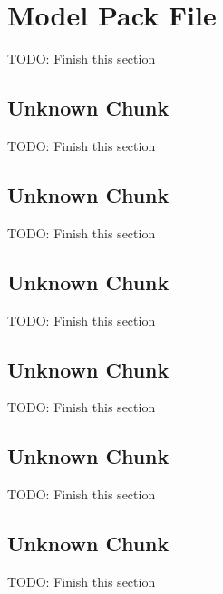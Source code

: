\section{Model Pack File}
\label{sec:pfMODL}

TODO: Finish this section

\subsection{Unknown Chunk}
\label{subsec:pfchunkANIM}

TODO: Finish this section

\subsection{Unknown Chunk}
\label{subsec:pfchunkMODL}

TODO: Finish this section

\subsection{Unknown Chunk}
\label{subsec:pfchunkGEOM}

TODO: Finish this section

\subsection{Unknown Chunk}
\label{subsec:pfchunkPRPS}

TODO: Finish this section

\subsection{Unknown Chunk}
\label{subsec:pfchunkROOT}

TODO: Finish this section

\subsection{Unknown Chunk}
\label{subsec:pfchunkSKEL}

TODO: Finish this section

\clearpage

